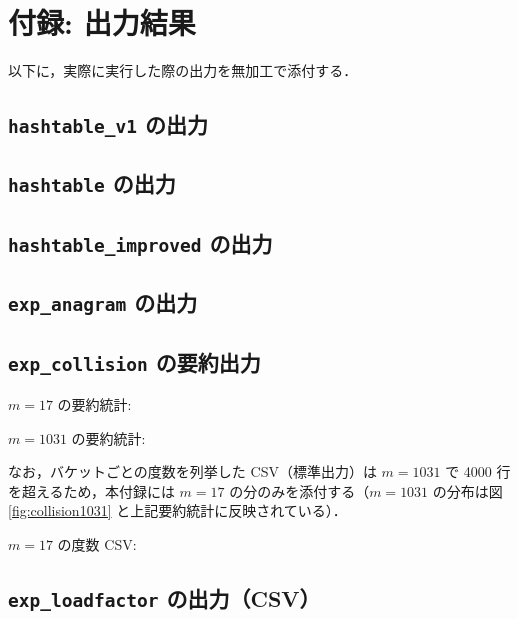\section{付録: 出力結果}

以下に，実際に実行した際の出力を無加工で添付する．

\subsection{{\tt hashtable\_v1} の出力}
{\scriptsize}

\subsection{{\tt hashtable} の出力}
{\scriptsize}

\subsection{{\tt hashtable\_improved} の出力}
{\scriptsize}

\subsection{{\tt exp\_anagram} の出力}
{\scriptsize}

\subsection{{\tt exp\_collision} の要約出力}

$m=17$ の要約統計:
{\scriptsize}

$m=1031$ の要約統計:
{\scriptsize}

なお，バケットごとの度数を列挙した CSV（標準出力）は $m=1031$ で 4000 行を超えるため，本付録には $m=17$ の分のみを添付する（$m=1031$ の分布は図 \ref{fig:collision1031} と上記要約統計に反映されている）．

$m=17$ の度数 CSV:
{\scriptsize}

\subsection{{\tt exp\_loadfactor} の出力（CSV）}
{\scriptsize}


